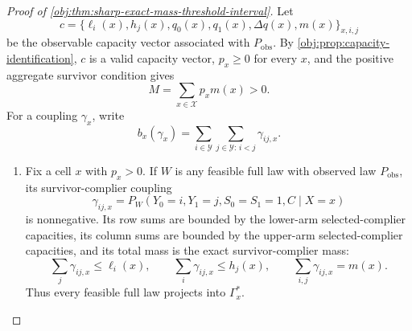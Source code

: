 \begin{proof}[Proof of \cref{obj:thm:sharp-exact-mass-threshold-interval}]
Let
\[
c=\{\ell_i(x),h_j(x),q_0(x),q_1(x),\Delta q(x),m(x)\}_{x,i,j}
\]
be the observable capacity vector associated with \(P_{\mathrm{obs}}\).  By
\cref{obj:prop:capacity-identification}, \(c\) is a valid capacity vector,
\(p_x\ge 0\) for every \(x\), and the positive aggregate survivor condition gives
\[
M=\sum_{x\in\mathcal X}p_xm(x)>0 .
\]
For a coupling \(\gamma_x\), write
\[
b_x(\gamma_x)=\sum_{i\in\mathcal Y}\sum_{j\in\mathcal Y:\,i<j}\gamma_{ij,x}.
\]

\begin{enumerate}
\item Fix a cell \(x\) with \(p_x>0\).  If \(W\) is any feasible full law with observed law \(P_{\mathrm{obs}}\), its survivor-complier coupling
\[
\gamma_{ij,x}
=
P_W(Y_0=i,Y_1=j,S_0=S_1=1,C\mid X=x)
\]
is nonnegative.  Its row sums are bounded by the lower-arm selected-complier capacities, its column sums are bounded by the upper-arm selected-complier capacities, and its total mass is the exact survivor-complier mass:
\[
\sum_j\gamma_{ij,x}\le \ell_i(x),\qquad
\sum_i\gamma_{ij,x}\le h_j(x),\qquad
\sum_{i,j}\gamma_{ij,x}=m(x).
\]
Thus every feasible full law projects into \(\Gamma_x^\ast\).


\end{enumerate}
\end{proof}
